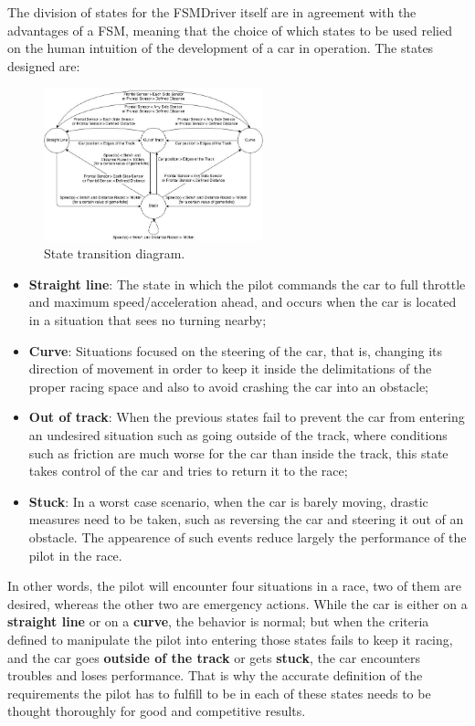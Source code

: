 The division of states for the FSMDriver itself are in agreement with the advantages of a FSM, meaning that the choice of
which states to be used relied on the human intuition of the development of a car in operation. The states designed are:

\begin{figure}[!t]
\centering
\includegraphics[width=2.5in]{StatesDiagram}
\caption{State transition diagram.}
\label{fig_sim}
\end{figure}



\begin{itemize}
	\item \textbf{Straight line}: The state in which the pilot commands the car to full throttle and maximum 
	speed/acceleration ahead, and occurs when the car is located in a situation that sees no turning nearby;
	
	\item \textbf{Curve}: Situations focused on the steering of the car, that is, changing its direction of movement
	in order to keep it inside the delimitations of the proper racing space and also to avoid crashing the car into
	an obstacle;
	
	\item \textbf{Out of track}: When the previous states fail to prevent the car from entering an undesired situation
	such as going outside of the track, where conditions such as friction are much worse for the car than inside the
	track, this state takes control of the car and tries to return it to the race;
	
	\item \textbf{Stuck}: In a worst case scenario, when the car is barely moving, drastic measures need to be taken,
	such as reversing the car and steering it out of an obstacle. The appearence of such events reduce largely the
	performance of the pilot in the race.
\end{itemize}

In other words, the pilot will encounter four situations in a race, two of them are desired, whereas the other two are 
emergency actions. While the car is either on a \textbf{straight line} or on a \textbf{curve}, the behavior is normal; 
but when the criteria defined to manipulate the pilot into entering those states fails to keep it racing, and the car 
goes \textbf{outside of the track} or gets \textbf{stuck}, the car encounters troubles and loses performance. That is why
the accurate definition of the requirements the pilot has to fulfill to be in each of these states needs to be thought 
thoroughly for good and competitive results.
